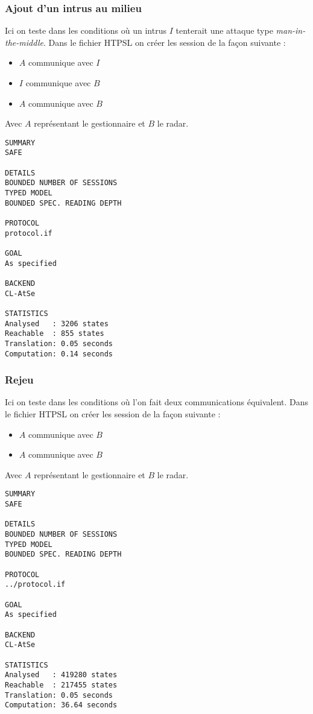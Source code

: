 \documentclass[]{scrartcl}
\begin{document}
\subsubsection{Ajout d'un intrus au milieu}

Ici on teste dans les conditions où un intrus $I$ tenterait une attaque type \textit{man-in-the-middle}. Dans le fichier HTPSL on créer les session de la façon suivante :
\begin{itemize}
	\item $A$ communique avec $I$
	\item $I$ communique avec $B$
	\item $A$ communique avec $B$
\end{itemize}

Avec $A$ représentant le gestionnaire et $B$ le radar.

\begin{lstlisting}[caption=Résultat d'éxécution - Man-in-the-middle ]
SUMMARY
SAFE

DETAILS
BOUNDED NUMBER OF SESSIONS
TYPED MODEL
BOUNDED SPEC. READING DEPTH

PROTOCOL
protocol.if

GOAL
As specified

BACKEND
CL-AtSe

STATISTICS
Analysed   : 3206 states
Reachable  : 855 states
Translation: 0.05 seconds
Computation: 0.14 seconds
\end{lstlisting}

\subsubsection{Rejeu}

Ici on teste dans les conditions où l'on fait deux communications équivalent. Dans le fichier HTPSL on créer les session de la façon suivante :
\begin{itemize}
	\item $A$ communique avec $B$
	\item $A$ communique avec $B$
\end{itemize}

Avec $A$ représentant le gestionnaire et $B$ le radar.

\begin{lstlisting}[caption=Résultat d'éxécution - Rejeu ]
SUMMARY
SAFE

DETAILS
BOUNDED NUMBER OF SESSIONS
TYPED MODEL
BOUNDED SPEC. READING DEPTH

PROTOCOL
../protocol.if

GOAL
As specified

BACKEND
CL-AtSe

STATISTICS
Analysed   : 419280 states
Reachable  : 217455 states
Translation: 0.05 seconds
Computation: 36.64 seconds
\end{lstlisting}
\end{document}
